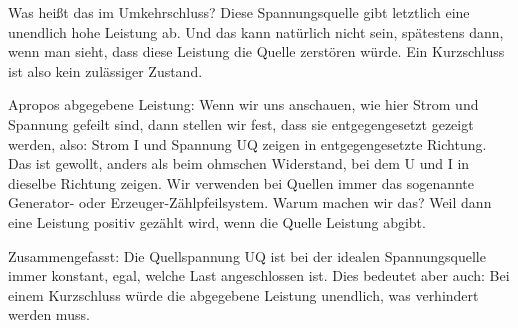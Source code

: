 \begin{frame}
{Was heißt das im Umkehrschluss? Diese Spannungsquelle gibt letztlich eine unendlich hohe Leistung ab.
Und das kann natürlich nicht sein, spätestens dann, wenn man sieht, dass diese Leistung die Quelle zerstören würde.
Ein Kurzschluss ist also kein zulässiger Zustand.

Apropos abgegebene Leistung:
Wenn wir uns anschauen, wie hier Strom und Spannung gefeilt sind, dann stellen wir fest,
dass sie entgegengesetzt gezeigt werden, also: Strom I und Spannung UQ zeigen in entgegengesetzte Richtung.
Das ist gewollt, anders als beim ohmschen Widerstand, bei dem U und I in dieselbe Richtung zeigen.
Wir verwenden bei Quellen immer das sogenannte Generator- oder Erzeuger-Zählpfeilsystem.
Warum machen wir das? Weil dann eine Leistung positiv gezählt wird, wenn die Quelle Leistung abgibt.

Zusammengefasst:
Die Quellspannung UQ ist bei der idealen Spannungsquelle immer konstant, egal, welche Last angeschlossen ist.
Dies bedeutet aber auch: Bei einem Kurzschluss würde die abgegebene Leistung unendlich, was verhindert werden muss.
}
\end{frame}


